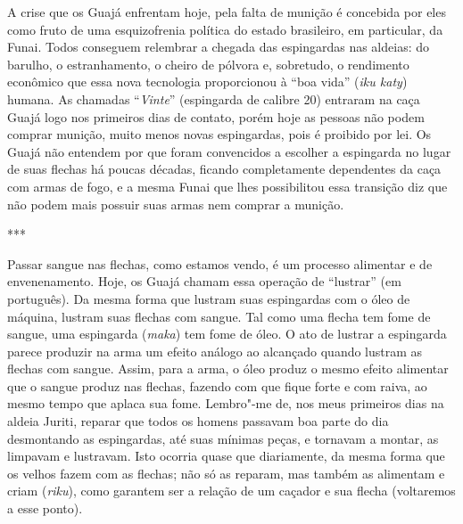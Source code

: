 A crise que os Guajá enfrentam hoje, pela falta de munição é concebida
por eles como fruto de uma esquizofrenia política do estado brasileiro,
em particular, da Funai. Todos conseguem relembrar a chegada das
espingardas nas aldeias: do barulho, o estranhamento, o cheiro de
pólvora e, sobretudo, o rendimento econômico que essa nova tecnologia
proporcionou à ``boa vida'' (\emph{iku katy}) humana. As chamadas
``\emph{Vinte}'' (espingarda de calibre 20) entraram na caça Guajá logo
nos primeiros dias de contato, porém hoje as pessoas não podem comprar
munição, muito menos novas espingardas, pois é proibido por lei. Os
Guajá não entendem por que foram convencidos a escolher a espingarda no
lugar de suas flechas há poucas décadas, ficando completamente
dependentes da caça com armas de fogo, e a mesma Funai que lhes
possibilitou essa transição diz que não podem mais possuir suas armas
nem comprar a munição.

\begin{center}
***
\end{center}

Passar sangue nas flechas, como estamos vendo, é um processo alimentar e
de envenenamento. Hoje, os Guajá chamam essa operação de ``lustrar'' (em
português). Da mesma forma que lustram suas espingardas com o óleo de
máquina, lustram suas flechas com sangue. Tal como uma flecha tem fome
de sangue, uma espingarda (\emph{maka}) tem fome de óleo. O ato de
lustrar a espingarda parece produzir na arma um efeito análogo ao
alcançado quando lustram as flechas com sangue. Assim, para a arma, o
óleo produz o mesmo efeito alimentar que o sangue produz nas flechas,
fazendo com que fique forte e com raiva, ao mesmo tempo que aplaca sua
fome. Lembro"-me de, nos meus primeiros dias na aldeia Juriti, reparar
que todos os homens passavam boa parte do dia desmontando as
espingardas, até suas mínimas peças, e tornavam a montar, as limpavam e
lustravam. Isto ocorria quase que diariamente, da mesma forma que os
velhos fazem com as flechas; não só as reparam, mas também as alimentam
e criam (\emph{riku}), como garantem ser a relação de um caçador e sua
flecha (voltaremos a esse ponto).

